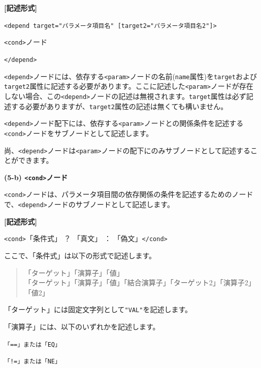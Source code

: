 \documentclass[a4paper,11pt]{jarticle}
\begin{document}
{\vspace{8pt}
\leftskip=12pt
\textbf{[記述形式]}

\leftskip=42pt
\texttt{<depend target="パラメータ項目名" [target2="パラメータ項目名2"]>} 
   

\parindent=14pt
\texttt{<cond>}ノード

\parindent=0pt
\texttt{</depend>}

\vspace{8pt}
\leftskip=0pt
\texttt{<depend>}ノードには、依存する\texttt{<param>}ノードの名前({\tt name}属性)を\texttt{target}および\texttt{target2}属性に記述する必要があります。ここに記述した\texttt{<param>}ノードが存在しない場合、この\texttt{<depend>}ノードの記述は無視されます。\texttt{target}属性は必ず記述する必要がありますが、\texttt{target2}属性の記述は無くても構いません。

\texttt{<depend>}ノード配下には、依存する\texttt{<param>}ノードとの関係条件を記述する\texttt{<cond>}ノードをサブノードとして記述します。

\vspace{12pt}
尚、\texttt{<depend>}ノードは\texttt{<param>}ノードの配下にのみサブノードとして記述することができます。

\vspace{12pt}
\textbf{(5-b) \texttt{<cond>}ノード}

\texttt{<cond>}ノードは、パラメータ項目間の依存関係の条件を記述するためのノードで、\texttt{<depend>}ノードのサブノードとして記述します。

\vspace{8pt}
\leftskip=12pt
\textbf{[記述形式]}

\leftskip=42pt
\texttt{<cond>}「条件式」 ？ 「真文」 ： 「偽文」\texttt{</cond>}

\vspace{8pt}
\leftskip=0pt
ここで、「条件式」は以下の形式で記述します。
\begin{quote}
「ターゲット」「演算子」「値」\\
「ターゲット」「演算子」「値」「結合演算子」「ターゲット2」「演算子2」「値2」
\end{quote}

「ターゲット」には固定文字列として\texttt{"VAL"}を記述します。

\vspace{12pt}

「演算子」には、以下のいずれかを記述します。

\leftskip=10pt
{\tt 「==」または「EQ」}

{\tt 「!=」または「NE」}

}
\end{document}
